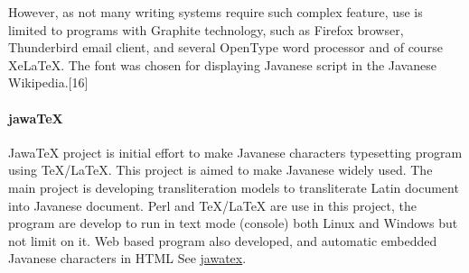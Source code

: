 However, as not many writing systems require such complex feature, use is limited to programs with Graphite technology, such as Firefox browser, Thunderbird email client, and several OpenType word processor and of course XeLaTeX. The font was chosen for displaying Javanese script in the Javanese Wikipedia.[16]

\paragraph{jawaTeX} Jawa\TeX{} project is initial effort to make Javanese characters typesetting program using \TeX{}/\LaTeX{}. This project is aimed to make Javanese widely used. The main project is developing transliteration models to transliterate Latin document into Javanese document. Perl and \TeX{}/\LaTeX{} are use in this project, the program are develop to run in text mode (console) both Linux and Windows but not limit on it. Web based program also developed, and automatic embedded Javanese characters in HTML See \href{http://jawatex.org/jawa/jawatex}{jawatex}.

